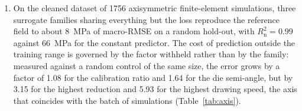 \documentclass[subscriptcorrection,upint,varvw,barcolor=Goldenrod3,mathalfa=cal=euler,balance,hyphenate,french,pdf-a]{asmejour} %
\begin{document}
\begin{enumerate}

\item On the cleaned dataset of 1756 axisymmetric finite-element simulations, three surrogate families sharing everything but the loss reproduce the reference field to about 8~MPa of macro-RMSE on a random hold-out, with $R^2_{\mathrm{n}} = 0.99$ against 66~MPa for the constant predictor. The cost of prediction outside the training range is governed by the factor withheld rather than by the family: measured against a random control of the same size, the error grows by a factor of 1.08 for the calibration ratio and 1.64 for the die semi-angle, but by 3.15 for the highest reduction and 5.93 for the highest drawing speed, the axis that coincides with the batch of simulations (Table~\ref{tab:axis}).


\end{enumerate}
\end{document}
